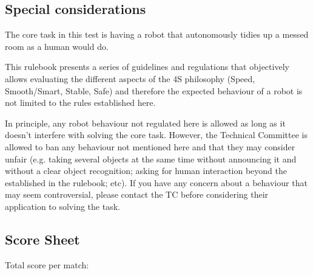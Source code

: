 \documentclass{article}
\begin{document}

\subsection{Special considerations}

The core task in this test is having a robot that autonomously tidies up a messed room as a human would do. 

This rulebook presents a series of guidelines and regulations that objectively allows evaluating the different aspects of the 4S philosophy (Speed, Smooth/Smart, Stable, Safe) and therefore the expected behaviour of a robot is not limited to the rules established here. 

In principle, any robot behaviour not regulated here is allowed as long as it doesn't interfere with solving the core task. However, the Technical Committee is allowed to ban any behaviour not mentioned here and that they may consider unfair (e.g. taking several objects at the same time without announcing it and without a clear object recognition; asking for human interaction beyond the established in the rulebook; etc). If you have any concern about a behaviour that may seem controversial, please contact the TC before considering their application to solving the task.

\iffalse
\newpage
\subsection{Score Sheet}

Total score per match:
\end{document}
